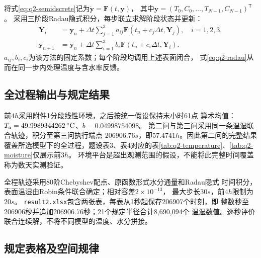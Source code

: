将式\eqref{eq:q2-semidscrete}记为$\dot{\boldsymbol y}=\boldsymbol F(t,\boldsymbol y)$，
其中$\boldsymbol y=(T_0,C_0,\ldots,T_{N-1},C_{N-1})^{\mathsf T}$。
采用三阶段Radau隐式积分\cite{scipy}，每步联立求解阶段状态并更新：
\begin{equation}
\begin{aligned}
\boldsymbol Y_i&=\boldsymbol y_n+\Delta t\sum_{j=1}^3
a_{ij}\boldsymbol F(t_n+c_j\Delta t,\boldsymbol Y_j),\quad i=1,2,3,\\
\boldsymbol y_{n+1}&=\boldsymbol y_n+\Delta t\sum_{i=1}^3
b_i\boldsymbol F(t_n+c_i\Delta t,\boldsymbol Y_i).
\end{aligned}
\label{eq:q2-radau}
\end{equation}
$a_{ij},b_i,c_i$为该方法的固定系数；每个阶段均调用上述表面闭合，
式\eqref{eq:q2-radau}从而在同一步内处理温度与含水率反馈。

\subsection{全过程输出与规定结果}

前$4\unit{h}$采用附件1分段线性环境，之后按统一假设保持末小时61点
算术均值：$T_a=49.9989344262\celsius$、$b=0.04998754098$。
第二问与第三问采用同一条温湿联合轨迹，积分至第三问执行端点
$206906.76\unit{s}$，即$57.4741\unit{h}$。因此第二问的完整结果
覆盖所选模型下的全过程，题设表3、表4对应的表\ref{tab:q2-temperature}、\ref{tab:q2-moisture}仅展示前$3\unit{h}$。
环境平台是超出观测范围的假设，不能将此完整时间覆盖称为数天实测验证。

全程轨迹采用80阶Chebyshev配点、原函数形式水分通量和Radau隐式
时间积分，表面温湿由Robin条件联合确定；相对容差$2\times10^{-13}$，
最大步长$30\unit{s}$，前$4\unit{h}$限制为$20\unit{s}$。
\texttt{result2.xlsx}包含两张表，每表从1秒起保存206907个时刻，即
整数秒至206906秒并追加206906.76秒；21个规定半径合计8,690,094个
温湿数值。逐秒评价联合连续解，不将不同模型的温度、水分拼接。

\subsection{规定表格及空间规律}
\begin{table}[!htb]
\centering\small
\caption{3小时内药材中截面温度（$^\circ$C）}
\label{tab:q2-temperature}

\end{table}

\begin{table}[!htb]
\centering\small
\caption{3小时内药材中截面干基含水率（kg/kg）}
\label{tab:q2-moisture}

\end{table}

